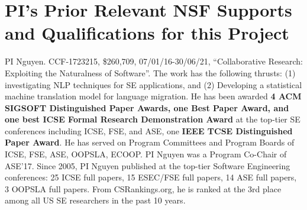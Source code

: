 \section{PI's Prior Relevant NSF Supports and Qualifications for this Project}
\label{prior}

PI Nguyen. CCF-1723215, \$260,709, 07/01/16-30/06/21, ``Collaborative
Research: Exploiting the Naturalness of Software''.
%
 The work has the following
thrusts: (1) investigating NLP techniques for SE
applications, and (2) Developing a statistical machine translation
model for language migration.
%
%
He has been awarded {\bf 4 ACM SIGSOFT Distinguished Paper Awards, one
  Best Paper Award, and one best ICSE Formal Research Demonstration
  Award} at the top-tier SE conferences including ICSE, FSE, and ASE,
one {\bf IEEE TCSE Distinguished Paper Award}. He has served on
Program Committees and Program Boards of ICSE, FSE, ASE, OOPSLA,
ECOOP. PI Nguyen was a Program Co-Chair of ASE'17. Since 2005, PI
Nguyen published at the top-tier Software Engineering conferences: 25
ICSE full papers, 15 ESEC/FSE full papers, 14 ASE full papers, 3
OOPSLA full papers.
From CSRankings.org, he is ranked at the 3rd place among all US SE researchers in the past 10 years.


